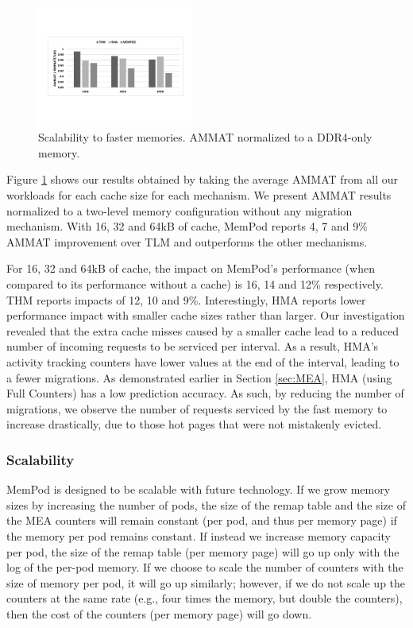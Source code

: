 \begin{figure}
  \includegraphics[width=0.46\textwidth]{figures/revised/new/cache_norm_tlm.pdf}
  \caption{Scalability to faster memories. AMMAT normalized to a DDR4-only memory.}
  \label{fig:cache_norm_tlm}
\end{figure}

Figure \ref{fig:cache_norm_tlm} shows our results obtained by taking the average AMMAT from all our workloads for each cache size for each mechanism. We present AMMAT results normalized to a two-level memory configuration without any migration mechanism. With 16, 32 and 64kB of cache, MemPod reports 4, 7 and 9\% AMMAT improvement over TLM and outperforms the other mechanisms.

For 16, 32 and 64kB of cache, the impact on MemPod's performance (when compared to its performance without a cache) is 16, 14 and 12\% respectively. THM reports impacts of 12, 10 and 9\%. Interestingly, HMA reports lower performance impact with smaller cache sizes rather than larger. Our investigation revealed that the extra cache misses caused by a smaller cache lead to a reduced number of incoming requests to be serviced per interval. As a result, HMA's activity tracking counters have lower values at the end of the interval, leading to a fewer migrations. As demonstrated earlier in Section \ref{sec:MEA}, HMA (using Full Counters) has a low prediction accuracy. As such, by reducing the number of migrations, we observe the number of requests serviced by the fast memory to increase drastically, due to those hot pages that were not mistakenly evicted.

\subsubsection{Scalability}

MemPod is designed to be scalable with future technology.  If we grow memory
sizes by increasing the number of pods, the size of the remap table and the 
size of the MEA counters will remain constant (per pod, and thus per memory
page) if the memory per pod remains constant.  If instead we increase
memory capacity per pod, the size of the remap table (per memory page)
will go up only with the log of the per-pod memory. If we choose to scale
the number of counters with the size of memory per pod, it will go up
similarly; however, if we do not scale up the counters at the same rate
(e.g., four times the memory, but double the counters), then the cost
of the counters (per memory page) will go down.

